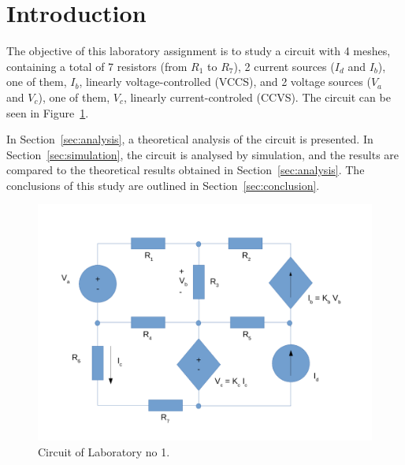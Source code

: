 \section{Introduction}
\label{sec:introduction}

The objective of this laboratory assignment is to study a circuit with 4 meshes, containing a total of 7 resistors (from $R_1$ to $R_7$), 2 current sources ($I_d$ and $I_b$), one of them, $I_b$, linearly voltage-controlled (VCCS), and 2 voltage sources ($V_a$ and $V_c$), one of them, $V_c$, linearly current-controled (CCVS). The circuit can be seen in Figure~\ref{fig:circuit_intro}.

In Section~\ref{sec:analysis}, a theoretical analysis of the circuit is
presented. In Section~\ref{sec:simulation}, the circuit is analysed by
simulation, and the results are compared to the theoretical results obtained in
Section~\ref{sec:analysis}. The conclusions of this study are outlined in
Section~\ref{sec:conclusion}.

\begin{figure}[h] \centering
\includegraphics[width=0.4\linewidth]{circuit_intro.pdf}
\caption{Circuit of Laboratory no 1.}
\label{fig:circuit_intro}
\end{figure}

